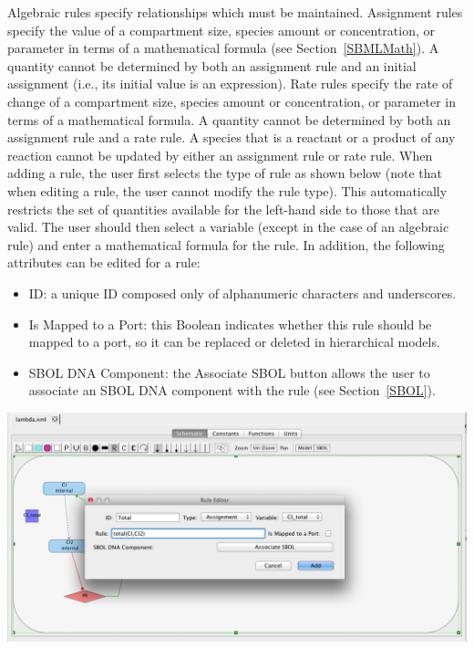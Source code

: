 \documentclass[titlepage,11pt]{article}
\begin{document}
\noindent
Algebraic rules specify relationships which must be maintained.  Assignment rules specify the value of a compartment size, species amount or concentration, or parameter in terms of a mathematical formula (see Section~\ref{SBMLMath}).  A quantity cannot be determined by both an assignment rule and an initial assignment (i.e., its initial value is an expression).  Rate rules specify the rate of change of a compartment size, species amount or concentration, or parameter in terms of a mathematical formula.  A quantity cannot be determined by both an assignment rule and a rate rule.  A species that is a reactant or a product of any reaction cannot be updated by either an assignment rule or rate rule.  When adding a rule, the user first selects the type of rule as shown below (note that when editing a rule, the user cannot modify the rule type).  
This automatically restricts the set of quantities available for the left-hand side to those that are valid.  The user should then select a variable (except in the case of an algebraic rule) and enter a mathematical formula for the rule.  In addition, the following attributes can be edited for a rule:
\begin{itemize}
\item ID: a unique ID composed only of alphanumeric characters and underscores.
\item Is Mapped to a Port: this Boolean indicates whether this rule should be mapped to a port, so it can be replaced or deleted in hierarchical models.
\item SBOL DNA Component: the Associate SBOL button allows the user to associate an SBOL DNA component with the rule (see Section~\ref{SBOL}).
\end{itemize}

\begin{center}
\includegraphics[width=160mm]{screenshots/rule}
\end{center}
\end{document}
